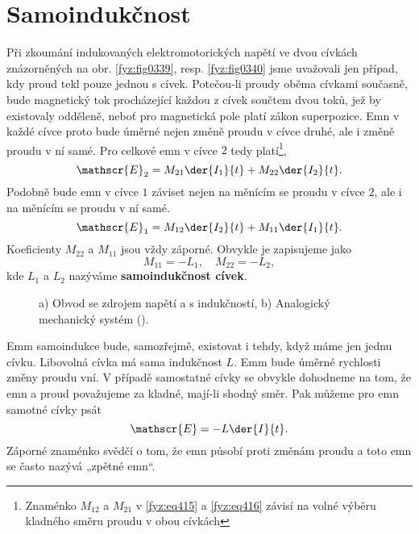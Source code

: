 \section{Samoindukčnost}\label{fyz:IIchapXVIIsecVII}
  Při zkoumání indukovaných elektromotorických napětí ve dvou cívkách znázorněných na obr. 
  \ref{fyz:fig0339}, resp. \ref{fyz:fig0340} jsme uvažovali jen případ, kdy proud tekl pouze jednou s 
  cívek. Potečou-li proudy oběma cívkami současně, bude magnetický tok procházející každou z cívek 
  součtem dvou toků, jež by existovaly odděleně, neboť pro magnetická pole platí zákon superpozice. 
  Emn v každé cívce proto bude úměrné nejen změně proudu v cívce druhé, ale i změně proudu v ní 
  samé. Pro celkové emn v cívce \(2\) tedy platí\footnote{Znaménko \(M_{12}\) a  \(M_{21}\) v 
  \ref{fyz:eq415} a \ref{fyz:eq416} závisí na volné výběru kladného směru proudu v obou cívkách},
  \begin{equation}\label{fyz:eq415}
    \mathscr{E}_2 = M_{21}\der{I_1}{t} + M_{22}\der{I_2}{t}.
  \end{equation}
  Podobně bude emn v cívce \(1\) záviset nejen na měnícím se proudu v cívce \(2\), ale i na měnícím 
  se proudu v ní samé.
  \begin{equation}\label{fyz:eq416}
    \mathscr{E}_1 = M_{12}\der{I_2}{t} + M_{11}\der{I_1}{t}.
  \end{equation}
  Koeficienty \(M_{22}\) a \(M_{11}\) jsou vždy záporné. Obvykle je zapisujeme jako 
  \begin{equation}\label{fyz:eq417}
    M_{11} = -L_1,\quad  M_{22} = - L_2,
  \end{equation}
  kde \(L_1\) a \(L_2\) nazýváme \textbf{samoindukčnost cívek}. 
  
  \begin{figure}[hb!]
    \centering
    \caption{a) Obvod se zdrojem napětí a s indukčností, b) Analogický mechanický systém
             (\cite[s.~307]{Feynman02}).}
    \label{fyz:fig0341}
  \end{figure}
  
  Emm samoindukce bude, samozřejmě, existovat i tehdy, když máme jen jednu cívku. Libovolná cívka 
  má sama indukčnost \(L\). Emm bude úměrné rychlosti změny proudu vní. V případě samostatné cívky 
  se obvykle dohodneme na tom, že emn a proud považujeme za kladné, mají-li shodný směr. Pak můžeme 
  pro emn samotné cívky psát
  \begin{equation}\label{fyz:eq418}
    \mathscr{E} = - L\der{I}{t}.
  \end{equation}
  Záporné znaménko svědčí o tom, že emn působí proti změnám proudu a toto emn se často nazývá 
  „zpětné emn“.
  
